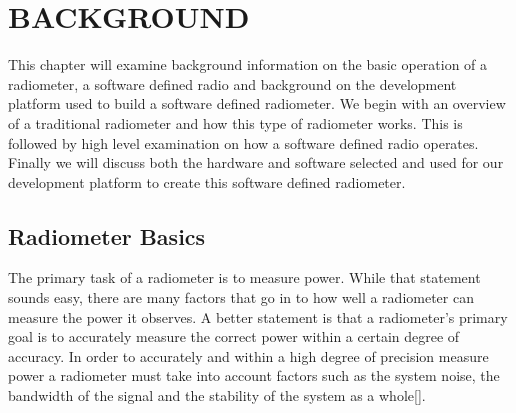 

\chapter{BACKGROUND}\label{ch:background}

This chapter will examine background information on the basic operation of a radiometer, a software defined radio and background on the development platform used to build a software defined radiometer.  We begin with an overview of a traditional radiometer and how this type of radiometer works.  This is followed by high level examination on how a software defined radio operates.  Finally we will discuss both the hardware and software selected and used for our development platform to create this software defined radiometer.

\section{Radiometer Basics}

The primary task of a radiometer is to measure power.  While that statement sounds easy, there are many factors that go in to how well a radiometer can measure the power it observes.  A better statement is that a radiometer's primary goal is to accurately measure the correct power within a certain degree of accuracy.  In order to accurately and within a high degree of precision measure power a radiometer must take into account factors such as the system noise, the bandwidth of the signal and the stability of the system as a whole[\cite{Evans}].  

